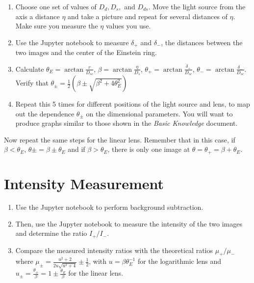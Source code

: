 \documentclass{article}
\begin{document}
\begin{enumerate}
    \item Choose one set of values of $D_d, D_s,$ and $D_{ds}$. Move the light source from the axis a distance $\eta$ and take a picture and repeat for several distances of $\eta$. Make sure you measure the $\eta$ values you use.
    \item Use the Jupyter notebook to measure $\delta_+$ and $\delta_-$, the distances between the two images and the center of the Einstein ring.
    \item Calculate $\theta_E=\arctan\frac{r}{D_{sc}}$, $\beta=\arctan\frac{\eta}{D_s}$, $\theta_+=\arctan\frac{\delta_+}{D_{sc}}$, $\theta_-=\arctan\frac{\delta_-}{D_{sc}}$. Verify that $\theta_\pm=\frac{1}{2}(\beta\pm\sqrt{\beta^2+4\theta^2_E})$
    \item Repeat this 5 times for different positions of the light source and lens, to map out the dependence $\theta_\pm$ on the dimensional parameters. You will want to produce graphs similar to those shown in the \textit{Basic Knowledge} document.
    
\end{enumerate}

\noindent Now repeat the same steps for the linear lens. Remember that in this case, if $\beta<\theta_E$, $\theta\pm=\beta\pm\theta_E$ and if $\beta>\theta_E$, there is only one image at $\theta=\theta_+=\beta+\theta_E$. 

\section*{Intensity Measurement}
\begin{enumerate}
    \item Use the Jupyter notebook to perform background subtraction.
    \item Then, use the Jupyter notebook to measure the intensity of the two images and determine the ratio $I_+/I_-$.
    \item Compare the measured intensity ratios with the theoretical ratios $\mu_+/\mu_-$ where $\mu_\pm=\frac{u^2+2}{2u\sqrt{u^2+4}}\pm\frac{1}{2}$, with $u=\beta\theta_E^{-1}$ for the logarithmic lens and $u_\pm=\frac{\theta_\pm}{\beta}=1\pm\frac{\theta_E}{\beta}$ for the linear lens.
\end{enumerate}
\end{document}
